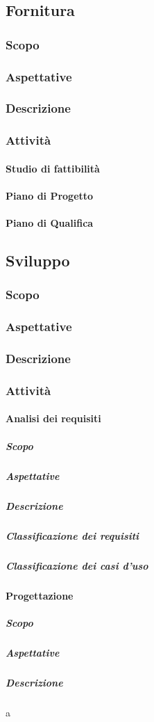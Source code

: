 \documentclass[../norme-di-progetto.tex]{subfiles}
\begin{document}
\subsection{Fornitura}
\subsubsection{Scopo}
\subsubsection{Aspettative}
\subsubsection{Descrizione}
\subsubsection{Attività}
\paragraph{Studio di fattibilità}
\paragraph{Piano di Progetto}
\paragraph{Piano di Qualifica}

\subsection{Sviluppo}
\subsubsection{Scopo}
\subsubsection{Aspettative}
\subsubsection{Descrizione}
\subsubsection{Attività}
\paragraph{Analisi dei requisiti}
\subparagraph*{Scopo}
\subparagraph*{Aspettative}
\subparagraph*{Descrizione}
\subparagraph*{Classificazione dei requisiti}
\subparagraph*{Classificazione dei casi d'uso}
\paragraph{Progettazione}
\subparagraph*{Scopo}
\subparagraph*{Aspettative}
\subparagraph*{Descrizione}
a

\newpage
\end{document}
